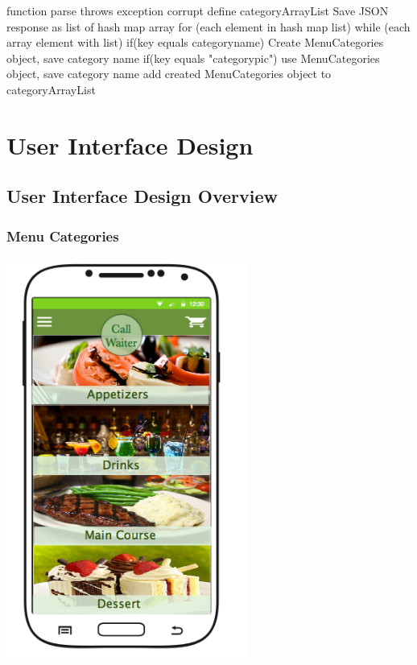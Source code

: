 \documentclass[12pt, titlepage]{article}
\begin{document}
	function parse throws exception corrupt		
		define categoryArrayList 
		Save JSON response as list of hash map array
        for (each element in hash map list) {
            while (each  array element with list) {
                if(key equals categoryname){
                    Create MenuCategories object, save category name
                }
                if(key equals "categorypic"){
                    use MenuCategories object, save category name
                }
            }
            add created MenuCategories object to categoryArrayList
        }


\subsubsection{}


\section{User Interface Design}

\subsection{User Interface Design Overview}

\subsubsection{Menu Categories}
\includegraphics[width=80mm,scale=0.5]{MenuCategories.png}
\end{document}
